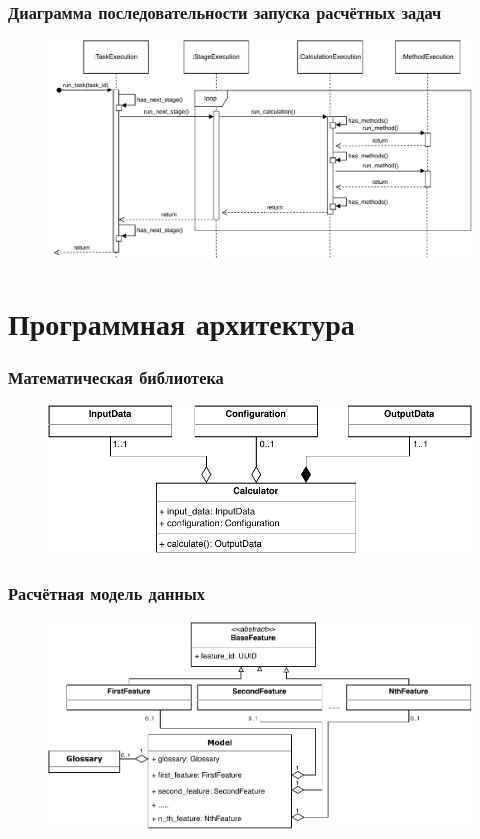 \begin{frame}
\frametitle{Диаграмма последовательности запуска расчётных задач}
\begin{figure}
    \includegraphics[scale=.7]{pictures/architecture/orchestrator_sequence}
\end{figure}
\end{frame}


\section{Программная архитектура}

\begin{frame}
\frametitle{Математическая библиотека}
\begin{figure}
    \includegraphics[scale=.8]{pictures/architecture/math_classes}
\end{figure}
\end{frame}

\begin{frame}
\frametitle{Расчётная модель данных}
\begin{figure}
    \includegraphics[scale=.7]{pictures/architecture/model_classes}
\end{figure}
\end{frame}
